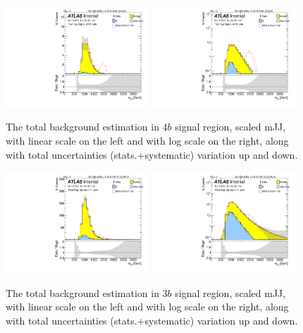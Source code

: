 \begin{figure}
\begin{center}
\includegraphics[angle=270, width=0.48\textwidth]{./figures/boosted/Signal_Syst/Moriond_bkg_9_FourTag_Signal_mHH_pole_blind.pdf}
\includegraphics[angle=270, width=0.48\textwidth]{./figures/boosted/Signal_Syst/Moriond_bkg_9_FourTag_Signal_mHH_pole_1_blind.pdf}
\caption{The total background estimation in $4b$ signal region, scaled mJJ, with linear scale on the left and with log scale on the right, along with total uncertainties (stats.$+$systematic) variation up and down.}
\label{fig:FinalBkg_sys-4b-pole}
\end{center}
\end{figure}


\begin{figure}
\begin{center}
\includegraphics[angle=270, width=0.48\textwidth]{./figures/boosted/Signal_Syst/Moriond_bkg_9_ThreeTag_Signal_mHH_pole_blind.pdf}
\includegraphics[angle=270, width=0.48\textwidth]{./figures/boosted/Signal_Syst/Moriond_bkg_9_ThreeTag_Signal_mHH_pole_1_blind.pdf}
\caption{The total background estimation in $3b$ signal region, scaled mJJ, with linear scale on the left and with log scale on the right, along with total uncertainties (stats.$+$systematic) variation up and down.}
\label{fig:FinalBkg_sys-3b-pole}
\end{center}
\end{figure}


